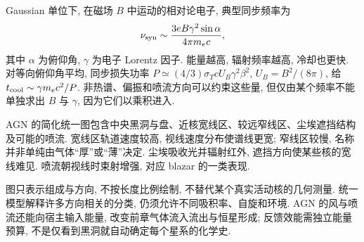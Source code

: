 Gaussian 单位下, 在磁场 $B$ 中运动的相对论电子, 典型同步频率为
\[
\nu_{
\rm syn}\sim\frac{3eB\gamma^2\sin\alpha}{4\pi m_ec},
\]
其中 $\alpha$ 为俯仰角, $\gamma$ 为电子 Lorentz 因子. 能量越高, 辐射频率越高, 冷却也更快. 对等向俯仰角平均, 同步损失功率 $P\simeq(4/3)\sigma_TcU_B\gamma^2\beta^2$, $U_B=B^2/(8\pi)$, 给 $t_{
\rm cool}\sim\gamma m_ec^2/P$. 非热谱、偏振和喷流方向可以约束这些量, 但仅由某个频率不能单独求出 $B$ 与 $\gamma$, 因为它们以乘积进入.

AGN 的简化统一图包含中央黑洞与盘、近核宽线区、较远窄线区、尘埃遮挡结构及可能的喷流. 宽线区轨道速度较高, 视线速度分布使谱线更宽; 窄线区较慢, 名称并非单纯由气体“厚”或“薄”决定. 尘埃吸收光并辐射红外, 遮挡方向使某些核的宽线难见. 喷流朝视线时束射增强, 对应 blazar 的一类表现.

\begin{center}
\end{center}
图只表示组成与方向, 不按长度比例绘制, 不替代某个真实活动核的几何测量. 统一模型解释许多方向相关的分类, 仍须允许不同吸积率、自旋和环境. AGN 的风与喷流还能向宿主输入能量, 改变前章气体流入流出与恒星形成; 反馈效能需独立能量预算, 不是仅看到黑洞就自动确定每个星系的化学史.
